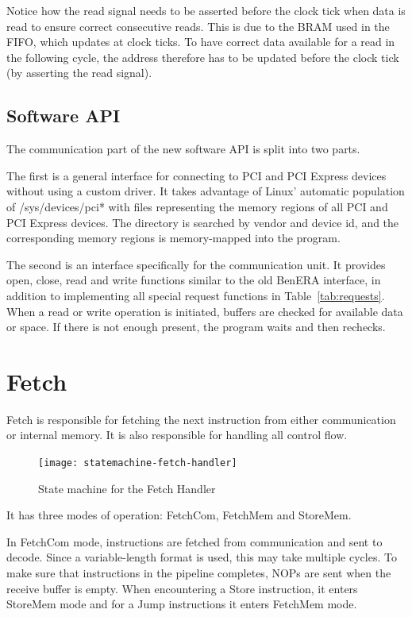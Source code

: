 Notice how the read signal needs to be asserted before the clock tick when data is read to ensure correct consecutive reads.
This is due to the BRAM used in the FIFO, which updates at clock ticks.
To have correct data available for a read in the following cycle, the address therefore has to be updated before the clock tick (by asserting the read signal).

\subsection{Software API}

The communication part of the new software API is split into two parts.

The first is a general interface for connecting to PCI and PCI Express devices without using a custom driver.
It takes advantage of Linux' automatic population of /sys/devices/pci* with files representing the memory regions of all PCI and PCI Express devices.
The directory is searched by vendor and device id, and the corresponding memory regions is memory-mapped into the program.

The second is an interface specifically for the communication unit.
It provides open, close, read and write functions similar to the old BenERA interface, in addition to implementing all special request functions in Table~\ref{tab:requests}.
When a read or write operation is initiated, buffers are checked for available data or space.
If there is not enough present, the program waits and then rechecks.

\section{Fetch}

Fetch is responsible for fetching the next instruction from either communication or internal memory.
It is also responsible for handling all control flow.

\begin{figure}[!ht]
    \centering
    \texttt{[image: statemachine-fetch-handler]}
    \caption{State machine for the Fetch Handler}
    \label{fig:statemachine-fetch-handler}
\end{figure}

It has three modes of operation: FetchCom, FetchMem and StoreMem.

In FetchCom mode, instructions are fetched from communication and sent to decode.
Since a variable-length format is used, this may take multiple cycles.
To make sure that instructions in the pipeline completes, NOPs are sent when the receive buffer is empty.
When encountering a Store instruction, it enters StoreMem mode and for a Jump instructions it enters FetchMem mode.

